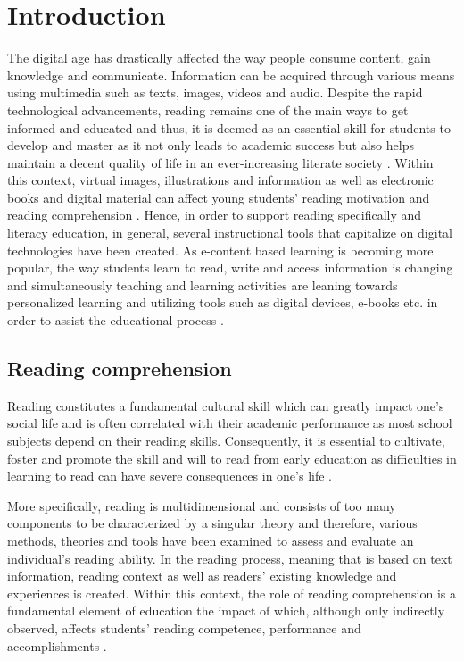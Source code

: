 \documentclass[english]{textolivre}
\begin{document}
\section{Introduction}\label{sec-intro}
The digital age has drastically affected the way people consume content, gain knowledge and communicate. Information can be acquired through various means using multimedia such as texts, images, videos and audio. Despite the rapid technological advancements, reading remains one of the main ways to get informed and educated and thus, it is deemed as an essential skill for students to develop and master as it not only leads to academic success but also helps maintain a decent quality of life in an ever-increasing literate society \cite{tan_reading_2020}. Within this context, virtual images, illustrations and information as well as electronic books and digital material can affect young students’ reading motivation and reading comprehension \cite{therole_2017}. Hence, in order to support reading specifically and literacy education, in general, several instructional tools that capitalize on digital technologies have been created. As e-content based learning is becoming more popular, the way students learn to read, write and access information is changing and simultaneously teaching and learning activities are leaning towards personalized learning and utilizing tools such as digital devices, e-books etc. in order to assist the educational process \cite{baron_reading_2017}.

\subsection{Reading comprehension}
Reading constitutes a fundamental cultural skill which can greatly impact one’s social life and is often correlated with their academic performance as most school subjects depend on their reading skills. Consequently, it is essential to cultivate, foster and promote the skill and will to read from early education as difficulties in learning to read can have severe consequences in one’s life \cite{hulme_learning_2013}.

More specifically, reading is multidimensional and consists of too many components to be characterized by a singular theory and therefore, various methods, theories and tools have been examined to assess and evaluate an individual’s reading ability. In the reading process, meaning that is based on text information, reading context as well as readers’ existing knowledge and experiences is created. Within this context, the role of reading comprehension is a fundamental element of education the impact of which, although only indirectly observed, affects students’ reading competence, performance and accomplishments \cite{pearson2017}.
\end{document}
